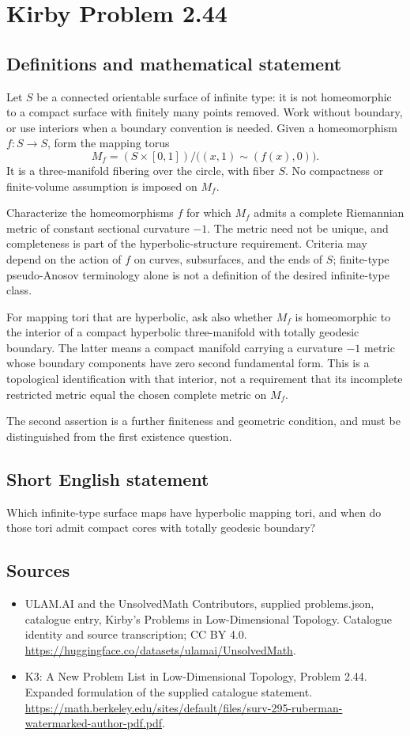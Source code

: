 \documentclass[11pt,a4paper]{article}
\begin{document}
\section*{Kirby Problem 2.44}\label{statement}

\subsection{Definitions and mathematical statement}
Let $S$ be a connected orientable surface of infinite type: it is not homeomorphic to a compact surface with finitely many points removed. Work without boundary, or use interiors when a boundary convention is needed. Given a homeomorphism $f:S\to S$, form the mapping torus
\[
M_f=(S\times[0,1])/\bigl((x,1)\sim(f(x),0)\bigr).
\]
It is a three-manifold fibering over the circle, with fiber $S$. No compactness or finite-volume assumption is imposed on $M_f$.

Characterize the homeomorphisms $f$ for which $M_f$ admits a complete Riemannian metric of constant sectional curvature $-1$. The metric need not be unique, and completeness is part of the hyperbolic-structure requirement. Criteria may depend on the action of $f$ on curves, subsurfaces, and the ends of $S$; finite-type pseudo-Anosov terminology alone is not a definition of the desired infinite-type class.

For mapping tori that are hyperbolic, ask also whether $M_f$ is homeomorphic to the interior of a compact hyperbolic three-manifold with totally geodesic boundary. The latter means a compact manifold carrying a curvature $-1$ metric whose boundary components have zero second fundamental form. This is a topological identification with that interior, not a requirement that its incomplete restricted metric equal the chosen complete metric on $M_f$.

The second assertion is a further finiteness and geometric condition, and must be distinguished from the first existence question.
\subsection{Short English statement}
Which infinite-type surface maps have hyperbolic mapping tori, and when do those tori admit compact cores with totally geodesic boundary?
\subsection{Sources}
\begin{itemize}
\item[S1] ULAM.AI and the UnsolvedMath Contributors, supplied problems.json, catalogue entry, Kirby's Problems in Low-Dimensional Topology. Catalogue identity and source transcription; CC BY 4.0.
\url{https://huggingface.co/datasets/ulamai/UnsolvedMath}.
\item[S2] K3: A New Problem List in Low-Dimensional Topology, Problem 2.44. Expanded formulation of the supplied catalogue statement.
\url{https://math.berkeley.edu/sites/default/files/surv-295-ruberman-watermarked-author-pdf.pdf}.
\end{itemize}
\end{document}
